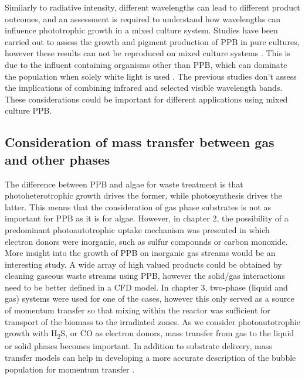 \skippingparagraph
Similarly to radiative intensity, different wavelengths can lead to different product outcomes, and an assessment is required to understand how wavelengths can influence phototrophic growth in a mixed culture system. Studies have been carried out to assess the growth and pigment production of PPB in pure cultures, however these results can not be reproduced on mixed culture systems \cite{kuo2012}. This is due to the influent containing organisms other than PPB, which can dominate the population when solely white light is used \cite{hulsen2015}. The previous studies don't assess the implications of combining infrared and selected visible wavelength bands. These considerations could be important for different applications using mixed culture PPB. 


\subsection{Consideration of mass transfer between gas and other phases}
The difference between PPB and algae for waste treatment is that photoheterotrophic growth drives the former, while photosynthesis drives the latter. This means that the consideration of gas phase substrates is not as important for PPB as it is for algae. However, in chapter 2, the possibility of a predominant photoautotrophic uptake mechanism was presented in which electron donors were inorganic, such as sulfur compounds or carbon monoxide. More insight into the growth of PPB on inorganic gas streams would be an interesting study. A wide array of high valued products could be obtained by cleaning gaseous waste streams using PPB, however the solid/gas interactions need to be better defined in a CFD model. In chapter 3, two-phase (liquid and gas) systems were used for one of the cases, however this only served as a source of momentum transfer so that mixing within the reactor was sufficient for transport of the biomass to the irradiated zones. As we consider photoautotrophic growth with H\textsubscript{2}S, or CO as electron donors, mass transfer from gas to the liquid or solid phases becomes important. In addition to substrate delivery, mass transfer models can help in developing a more accurate description of the bubble population for momentum transfer \cite{krishna2003}.

